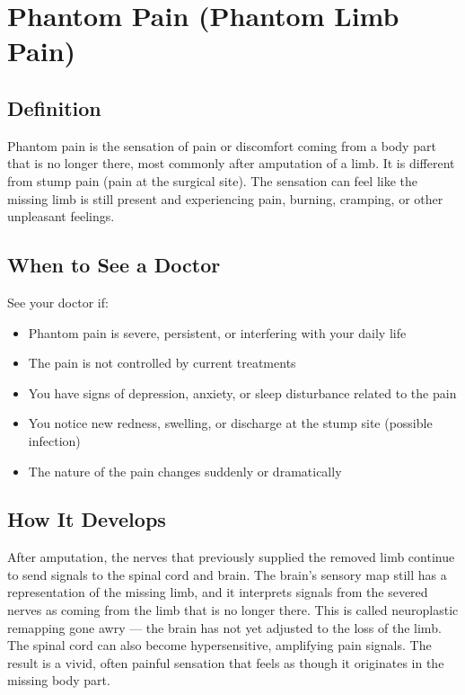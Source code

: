 \chapter{Phantom Pain (Phantom Limb Pain)}

\section*{Definition}
Phantom pain is the sensation of pain or discomfort coming from a body part that is no longer there, most commonly after amputation of a limb. It is different from stump pain (pain at the surgical site). The sensation can feel like the missing limb is still present and experiencing pain, burning, cramping, or other unpleasant feelings.

\section*{When to See a Doctor}
See your doctor if:
\begin{itemize}
  \item Phantom pain is severe, persistent, or interfering with your daily life
  \item The pain is not controlled by current treatments
  \item You have signs of depression, anxiety, or sleep disturbance related to the pain
  \item You notice new redness, swelling, or discharge at the stump site (possible infection)
  \item The nature of the pain changes suddenly or dramatically
\end{itemize}

\section*{How It Develops}
After amputation, the nerves that previously supplied the removed limb continue to send signals to the spinal cord and brain. The brain's sensory map still has a representation of the missing limb, and it interprets signals from the severed nerves as coming from the limb that is no longer there. This is called neuroplastic remapping gone awry — the brain has not yet adjusted to the loss of the limb. The spinal cord can also become hypersensitive, amplifying pain signals. The result is a vivid, often painful sensation that feels as though it originates in the missing body part.

